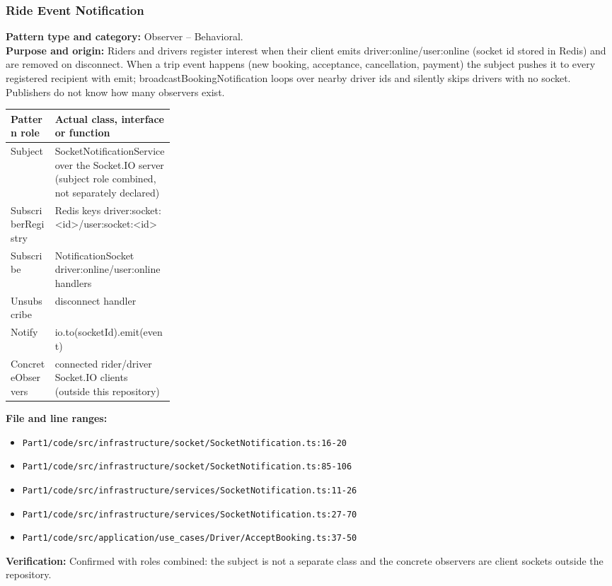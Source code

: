 \documentclass[11pt,a4paper]{article}
\begin{document}
\subsubsection*{Ride Event Notification}
\textbf{Pattern type and category:} Observer -- Behavioral.\\
\textbf{Purpose and origin:} Riders and drivers register interest when their client emits driver:online/user:online (socket id stored in Redis) and are removed on disconnect. When a trip event happens (new booking, acceptance, cancellation, payment) the subject pushes it to every registered recipient with emit; broadcastBookingNotification loops over nearby driver ids and silently skips drivers with no socket. Publishers do not know how many observers exist.

\noindent\begin{tabularx}{\linewidth}{@{}P{0.27\linewidth}Y@{}}
\toprule Pattern role & Actual class, interface or function \\ \midrule
Subject & SocketNotificationService over the Socket.IO server (subject role combined, not separately declared) \\
SubscriberRegistry & Redis keys driver:socket:\textless{}id\textgreater{}/user:socket:\textless{}id\textgreater{} \\
Subscribe & NotificationSocket driver:online/user:online handlers \\
Unsubscribe & disconnect handler \\
Notify & io.to(socketId).emit(event) \\
ConcreteObservers & connected rider/driver Socket.IO clients (outside this repository) \\
\bottomrule
\end{tabularx}

\noindent\textbf{File and line ranges:}\begin{itemize}\setlength\itemsep{0pt}\item \texttt{Part1/\allowbreak{}code/\allowbreak{}src/\allowbreak{}infrastructure/\allowbreak{}socket/\allowbreak{}SocketNotification.\allowbreak{}ts:16-20}\item \texttt{Part1/\allowbreak{}code/\allowbreak{}src/\allowbreak{}infrastructure/\allowbreak{}socket/\allowbreak{}SocketNotification.\allowbreak{}ts:85-106}\item \texttt{Part1/\allowbreak{}code/\allowbreak{}src/\allowbreak{}infrastructure/\allowbreak{}services/\allowbreak{}SocketNotification.\allowbreak{}ts:11-26}\item \texttt{Part1/\allowbreak{}code/\allowbreak{}src/\allowbreak{}infrastructure/\allowbreak{}services/\allowbreak{}SocketNotification.\allowbreak{}ts:27-70}\item \texttt{Part1/\allowbreak{}code/\allowbreak{}src/\allowbreak{}application/\allowbreak{}use\_\allowbreak{}cases/\allowbreak{}Driver/\allowbreak{}AcceptBooking.\allowbreak{}ts:37-50}\end{itemize}
\noindent\textbf{Verification:} Confirmed with roles combined: the subject is not a separate class and the concrete observers are client sockets outside the repository.
\end{document}
